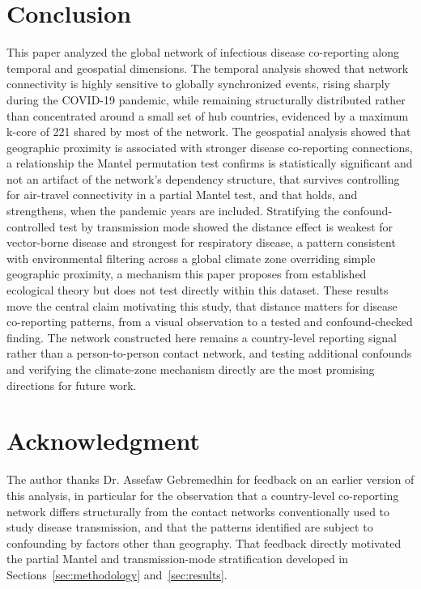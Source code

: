 \documentclass[11pt]{article}
\begin{document}
\section{Conclusion}

This paper analyzed the global network of infectious disease co-reporting along temporal
and geospatial dimensions. The temporal analysis showed that network connectivity is highly
sensitive to globally synchronized events, rising sharply during the COVID-19 pandemic,
while remaining structurally distributed rather than concentrated around a small set of hub
countries, evidenced by a maximum k-core of 221 shared by most of the network. The
geospatial analysis showed that geographic proximity is associated with stronger disease
co-reporting connections, a relationship the Mantel permutation test confirms is
statistically significant and not an artifact of the network's dependency structure, that
survives controlling for air-travel connectivity in a partial Mantel test, and that holds,
and strengthens, when the pandemic years are included. Stratifying the confound-controlled
test by transmission mode showed the distance effect is weakest for vector-borne disease
and strongest for respiratory disease, a pattern consistent with environmental filtering
across a global climate zone overriding simple geographic proximity, a mechanism this paper
proposes from established ecological theory but does not test directly within this dataset.
These results move the central claim motivating this study, that distance matters for
disease co-reporting patterns, from a visual observation to a tested and confound-checked
finding. The network constructed here remains a country-level reporting signal rather than
a person-to-person contact network, and testing additional confounds and verifying the
climate-zone mechanism directly are the most promising directions for future work.

\section*{Acknowledgment}

The author thanks Dr. Assefaw Gebremedhin for feedback on an earlier version of this
analysis, in particular for the observation that a country-level co-reporting network
differs structurally from the contact networks conventionally used to study disease
transmission, and that the patterns identified are subject to confounding by factors other
than geography. That feedback directly motivated the partial Mantel and transmission-mode
stratification developed in Sections~\ref{sec:methodology} and~\ref{sec:results}.
\end{document}
